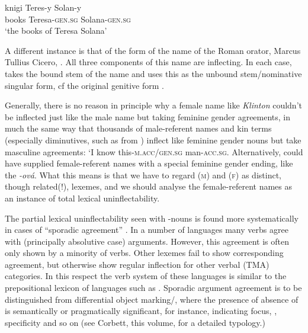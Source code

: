 \documentclass[output=paper,colorlinks,citecolor=brown]{langscibook}
\begin{document}
\ea\label{Solana}
\gll	knigi Teres-y Solan-y\\
books Teresa-\textsc{gen.sg} Solana-\textsc{gen.sg}\\
\glt			`the books of Teresa Solana'
\z

A different instance is that of the   form of the name of the Roman orator,   Marcus Tullius Cicero,  . All three components of this name are inflecting. In each case,  takes the bound stem of the  name and uses this as the unbound stem/nominative singular form, cf the original   genitive form .

Generally, there is   no reason in principle why a female name like \textit{Klinton} couldn't be inflected just like the male name but taking feminine gender agreements, in much the same way that thousands of male-referent names and kin terms (especially diminutives, such as  from ) inflect like feminine gender nouns but take masculine agreements:  `I know this-\textsc{m.acc/gen.sg} man-\textsc{acc.sg}. Alternatively,  could have supplied  female-referent names with a special feminine gender ending, like the  \textit{-ová}. What this means is that we have to  regard (\textsc{m}) and (\textsc{f}) as distinct, though related(!), lexemes, and we should analyse the female-referent  names as an instance of total lexical uninflectability. 

\sloppy
The partial lexical uninflectability seen with  -nouns is found more systematically in cases of ``sporadic agreement'' \citep{fedden2019}. In a number of  languages many verbs agree with (principally absolutive case) arguments.  However, this agreement is often only shown by a minority of verbs. Other lexemes  fail to show corresponding agreement, but otherwise show regular inflection for other verbal (TMA) categories. In this respect the verb system of these languages is similar to the prepositional lexicon of  languages such as . Sporadic argument agreement  is to be distinguished from differential object marking/, where the presence of absence of  is semantically or pragmatically significant, for instance, indicating focus, , specificity and so on (see Corbett, this volume, for a detailed typology.)
\end{document}

